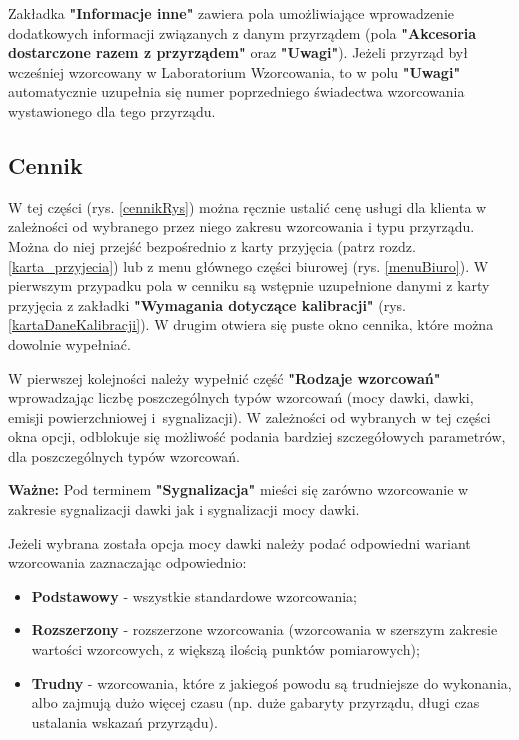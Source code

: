 Zakładka \textbf{"Informacje inne"} zawiera pola umożliwiające wprowadzenie dodatkowych informacji związanych z danym przyrządem (pola \textbf{"Akcesoria dostarczone razem z przyrządem"} oraz \textbf{"Uwagi"}). Jeżeli przyrząd był wcześniej wzorcowany w Laboratorium Wzorcowania, to w polu \textbf{"Uwagi"} automatycznie uzupełnia się numer poprzedniego świadectwa wzorcowania wystawionego dla tego przyrządu.

\subsection{Cennik}
\label{cennik}

W tej części (rys. \ref{cennikRys}) można ręcznie ustalić cenę usługi dla klienta w zależności od wybranego przez niego zakresu wzorcowania i typu przyrządu. Można do niej przejść bezpośrednio z karty przyjęcia (patrz rozdz. \ref{karta_przyjecia}) lub z menu głównego części biurowej (rys. \ref{menuBiuro}). W pierwszym przypadku pola w cenniku są wstępnie uzupełnione danymi z karty przyjęcia z zakładki \textbf{"Wymagania dotyczące kalibracji"} (rys. \ref{kartaDaneKalibracji}). W drugim otwiera się puste okno cennika, które można dowolnie wypełniać.

W pierwszej kolejności należy wypełnić część \textbf{"Rodzaje wzorcowań"} wprowadzając liczbę poszczególnych typów wzorcowań (mocy dawki, dawki, emisji powierzchniowej i~sygnalizacji). W zależności od wybranych w tej części okna opcji, odblokuje się możliwość podania bardziej szczegółowych parametrów, dla poszczególnych typów wzorcowań.

\textbf{Ważne:} Pod terminem \textbf{"Sygnalizacja"} mieści się zarówno wzorcowanie w zakresie sygnalizacji dawki jak i sygnalizacji mocy dawki.

Jeżeli wybrana została opcja mocy dawki należy podać odpowiedni wariant wzorcowania zaznaczając odpowiednio:
\begin{itemize}
	\item \textbf{Podstawowy} - wszystkie standardowe wzorcowania;
	\item \textbf{Rozszerzony} - rozszerzone wzorcowania (wzorcowania w szerszym zakresie wartości wzorcowych, z większą ilością punktów pomiarowych);
	\item \textbf{Trudny} - wzorcowania, które z jakiegoś powodu są trudniejsze do wykonania, albo zajmują dużo więcej czasu (np. duże gabaryty przyrządu, długi czas ustalania wskazań przyrządu).
\end{itemize}

